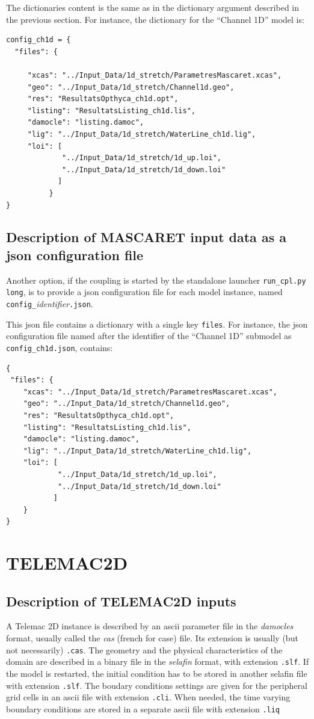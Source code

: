 \documentclass[Coupling]{../../data/TelemacDoc} %
\begin{document}
The dictionaries content is the same as in the dictionary argument described in
the previous section. For instance, the dictionary for the ``Channel 1D'' model is:
\begin{verbatim}
config_ch1d = {
  "files": {

     "xcas": "../Input_Data/1d_stretch/ParametresMascaret.xcas",
     "geo": "../Input_Data/1d_stretch/Channel1d.geo",
     "res": "ResultatsOpthyca_ch1d.opt",
     "listing": "ResultatsListing_ch1d.lis",
     "damocle": "listing.damoc",
     "lig": "../Input_Data/1d_stretch/WaterLine_ch1d.lig",
     "loi": [
             "../Input_Data/1d_stretch/1d_up.loi",
             "../Input_Data/1d_stretch/1d_down.loi"
            ]
          }
}
\end{verbatim}

\subsection{Description of MASCARET input data as a json configuration file }
Another option, if the coupling is started by the standalone launcher
\texttt{run\_cpl.py long}, is to provide a json configuration file 
for each model instance, named \\
\texttt{config\_}{\em identifier}\texttt{.json}.

This json file contains a dictionary with a single key \texttt{files}. For instance, the json configuration file named after the identifier of the ``Channel 1D'' submodel as \texttt{config\_ch1d.json}, contains:
\begin{verbatim}
{
 "files": {
    "xcas": "../Input_Data/1d_stretch/ParametresMascaret.xcas",
    "geo": "../Input_Data/1d_stretch/Channel1d.geo",
    "res": "ResultatsOpthyca_ch1d.opt",
    "listing": "ResultatsListing_ch1d.lis",
    "damocle": "listing.damoc",
    "lig": "../Input_Data/1d_stretch/WaterLine_ch1d.lig",
    "loi": [
            "../Input_Data/1d_stretch/1d_up.loi",
            "../Input_Data/1d_stretch/1d_down.loi"
           ]
    }
}
\end{verbatim}

\section{TELEMAC2D}\label{ftree:TELEMAC2D}
\subsection{Description of TELEMAC2D inputs}
A Telemac 2D instance is described by an ascii parameter file
in the {\em damocles} format, usually called the {\em cas} (french for
case) file. Its extension is usually (but not necessarily) \texttt{.cas}.  
The geometry and the physical characteristics of the domain are
described in a binary file in the {\em selafin} format, with extension
\texttt{.slf}. If the model is restarted, the initial condition has
to be stored in another selafin file with extension \texttt{.slf}.  
The boudary conditions settings are given for the
peripheral grid cells in an ascii file with extension
\texttt{.cli}. When needed, the time varying boundary conditions are stored in
a separate ascii file with extension \texttt{.liq}
\newline
\end{document}
